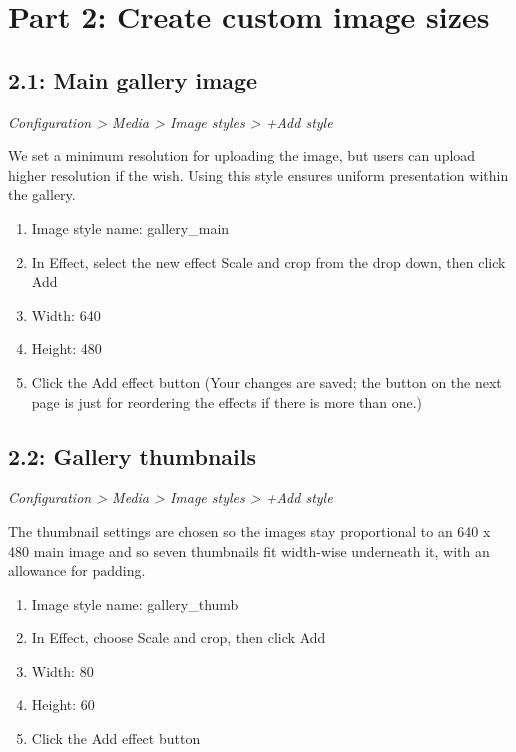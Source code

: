 \documentclass[letterpaper,10pt,english]{sphinxmanual}
\begin{document}
\section{Part 2: Create custom image sizes}
\label{slides:part-2-create-custom-image-sizes}

\subsection{2.1: Main gallery image}
\label{slides:main-gallery-image}
\emph{Configuration \textgreater{} Media \textgreater{} Image styles \textgreater{} +Add style}

We set a minimum resolution for uploading the image, but users can upload higher resolution if the wish. Using this style ensures uniform presentation within the gallery.
\begin{enumerate}
\item {} 
Image style name: gallery\_main

\item {} 
In Effect, select the new effect Scale and crop from the drop down, then click Add

\item {} 
Width: 640

\item {} 
Height: 480

\item {} 
Click the Add effect button (Your changes are saved; the button on the next page is just for reordering the effects if there is more than one.)

\end{enumerate}


\subsection{2.2: Gallery thumbnails}
\label{slides:gallery-thumbnails}
\emph{Configuration \textgreater{} Media \textgreater{} Image styles \textgreater{} +Add style}

The thumbnail settings are chosen so the images stay proportional to an 640 x 480 main image and so seven thumbnails fit width-wise underneath it, with an allowance for padding.
\begin{enumerate}
\item {} 
Image style name: gallery\_thumb

\item {} 
In Effect, choose Scale and crop, then click Add

\item {} 
Width: 80

\item {} 
Height: 60

\item {} 
Click the Add effect button

\end{enumerate}
\end{document}
